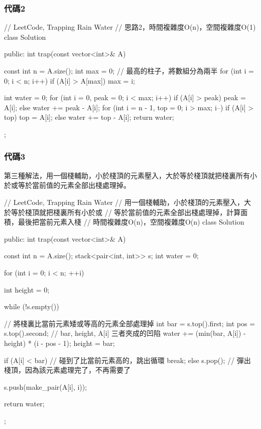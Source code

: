 \subsubsection{代碼2}
\begin{Code}
// LeetCode, Trapping Rain Water
// 思路2，時間複雜度O(n)，空間複雜度O(1)
class Solution {
public:
    int trap(const vector<int>& A) {
        const int n = A.size();
        int max = 0; // 最高的柱子，將數組分為兩半
        for (int i = 0; i < n; i++)
            if (A[i] > A[max]) max = i;

        int water = 0;
        for (int i = 0, peak = 0; i < max; i++)
            if (A[i] > peak) peak = A[i];
            else water += peak - A[i];
        for (int i = n - 1, top = 0; i > max; i--)
            if (A[i] > top) top = A[i];
            else water += top - A[i];
        return water;
    }
};
\end{Code}


\subsubsection{代碼3}
第三種解法，用一個棧輔助，小於棧頂的元素壓入，大於等於棧頂就把棧裏所有小於或等於當前值的元素全部出棧處理掉。
\begin{Code}
// LeetCode, Trapping Rain Water
// 用一個棧輔助，小於棧頂的元素壓入，大於等於棧頂就把棧裏所有小於或
// 等於當前值的元素全部出棧處理掉，計算面積，最後把當前元素入棧
// 時間複雜度O(n)，空間複雜度O(n)
class Solution {
public:
    int trap(const vector<int>& A) {
        const int n = A.size();
        stack<pair<int, int>> s;
        int water = 0;

        for (int i = 0; i < n; ++i) {
            int height = 0;

            while (!s.empty()) { // 將棧裏比當前元素矮或等高的元素全部處理掉
                int bar = s.top().first;
                int pos = s.top().second;
                // bar, height, A[i] 三者夾成的凹陷
                water += (min(bar, A[i]) - height) * (i - pos - 1);
                height = bar;

                if (A[i] < bar) // 碰到了比當前元素高的，跳出循環
                    break;
                else
                    s.pop(); // 彈出棧頂，因為該元素處理完了，不再需要了
            }

            s.push(make_pair(A[i], i));
        }

        return water;
    }
};
\end{Code}


